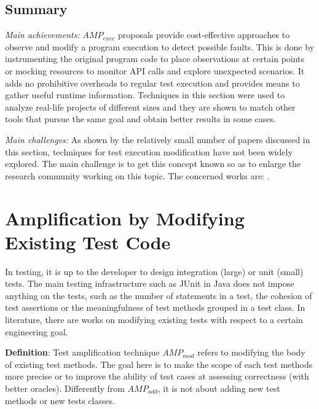 \subsection{Summary}
\label{subsec:sota:category-3:summary}

\emph{Main achievements:} $AMP_{exec}$ proposals provide cost-effective approaches to observe and modify a program execution to detect possible faults.
This is done by instrumenting the original program code to place observations at certain points or mocking resources to monitor API calls and explore unexpected scenarios.
It adds no prohibitive overheads to regular test execution and provides means to gather useful runtime information. 
Techniques in this section were used to analyze real-life projects of different sizes and they are shown to match other tools that pursue the same goal and obtain better results in some cases. 

\emph{Main challenges:} 
As shown by the relatively small number of papers discussed in this section, techniques for test execution modification have not been widely explored. 
The main challenge is to get this concept known so as to enlarge the research community working on this topic.
The concerned works are: \cite{zhang2012,ZhangE14,cornu2015exception,leung12,fang2015perfblower,Zhang2016Isomorphic}.

\section{Amplification by Modifying Existing Test Code}
\label{sec:sota:category-4}

In testing, it is up to the developer to design integration (large) or unit (small) tests.
The main testing infrastructure such as JUnit in Java does not impose anything on the tests, such as the number of statements in a test, the cohesion of test assertions or the meaningfulness of test methods grouped in a test class. 
In literature, there are works on modifying existing tests with respect to a certain engineering goal.

\medskip
\begin{mdframed}
\textbf{Definition}: Test amplification technique $AMP_{mod}$ refers to modifying the body of existing test methods. 
	The goal here is to make the scope of each test methods more precise or to improve the ability of test cases at assessing correctness (with better oracles). 
	Differently from $AMP_{add}$, it is not about adding new test methods or new tests classes.
\end{mdframed}
